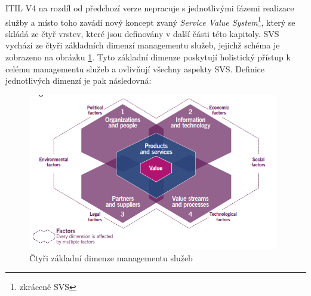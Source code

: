 \documentclass[
  digital,     %
  twoside,     %
  lof,         %
  lot,         %
]{fithesis4}
\begin{document}
ITIL V4 na rozdíl od předchozí verze nepracuje s jednotlivými fázemi realizace služby a místo toho zavádí nový koncept zvaný \emph{Service Value System}\footnote{zkráceně SVS}, který se skládá ze čtyř vrstev, které jsou definovány v další části této kapitoly. SVS vychází ze čtyři základních dimenzí managementu služeb, jejichž schéma je zobrazeno na obrázku \ref{fig:itil4_dimension}. Tyto základní dimenze poskytují holistický přístup k celému managementu služeb a ovlivňují všechny aspekty SVS.\parencite[s.~10]{Cartlidge2020} Definice jednotlivých dimenzí je pak následovná:

\begin{figure}[h]
  \begin{center}
          \includegraphics[width=11cm]{img/ITIL_V4_dimesions.png}
  \end{center}
  \caption{Čtyři základní dimenze managementu služeb \parencite[s.~32]{Cartlidge2020}}
  \label{fig:itil4_dimension}
\end{figure} 
\end{document}
